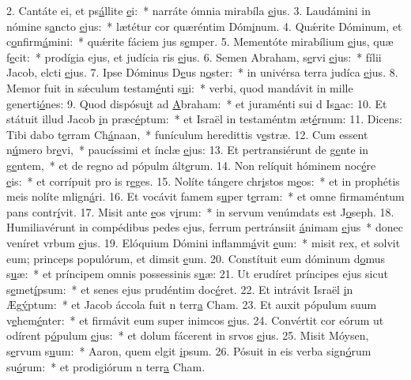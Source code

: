 2. Cantáte ei, et ps\uline{á}llite \uline{e}i:~* narráte ómnia mirabíla \uline{e}jus.
3. Laudámini in nómine s\uline{a}ncto \uline{e}jus:~* lætétur cor quæréntim Dóm\uline{i}num.
4. Quǽrite Dóminum, et c\uline{o}nfirm\uline{á}mini:~* quǽrite fáciem jus s\uline{e}mper.
5. Mementóte mirabílium \uline{e}jus, quæ f\uline{e}cit:~* prodígia ejus, et judícia ris \uline{e}jus.
6. Semen Abraham, s\uline{e}rvi \uline{e}jus:~* fílii Jacob, elcti \uline{e}jus.
7. Ipse Dóminus D\uline{e}us n\uline{o}ster:~* in univérsa terra judíca \uline{e}jus.
8. Memor fuit in sǽculum testam\uline{é}nti s\uline{u}i:~* verbi, quod mandávit in mille generti\uline{ó}nes:
9. Quod dispósu\uline{i}t ad \uline{A}braham:~* et juraménti sui d Is\uline{a}ac:
10. Et státuit illud Jacob \uline{i}n præc\uline{é}ptum:~* et Israël in testaméntm æt\uline{é}rnum:
11. Dicens: Tibi dabo t\uline{e}rram Ch\uline{á}naan,~* funículum heredittis v\uline{e}stræ.
12. Cum essent n\uline{ú}mero br\uline{e}vi,~* paucíssimi et ínclæ \uline{e}jus:
13. Et pertransiérunt de g\uline{e}nte in g\uline{e}ntem,~* et de regno ad pópulm ált\uline{e}rum.
14. Non relíquit hóminem noc\uline{é}re \uline{e}is:~* et corrípuit pro is r\uline{e}ges.
15. Nolíte tángere chr\uline{i}stos m\uline{e}os:~* et in prophétis meis nolíte mlign\uline{á}ri.
16. Et vocávit famem s\uline{u}per t\uline{e}rram:~* et omne firmaméntum pans contr\uline{í}vit.
17. Misit ante \uline{e}os v\uline{i}rum:~* in servum venúmdats est J\uline{o}seph.
18. Humiliavérunt in compédibus pedes ejus, ferrum pertránsiit \uline{á}nimam \uline{e}jus~* donec veníret vrbum \uline{e}jus.
19. Elóquium Dómini inflamm\uline{á}vit \uline{e}um:~* misit rex, et solvit eum; princeps populórum, et dimsit \uline{e}um.
20. Constítuit eum dóminum d\uline{o}mus s\uline{u}æ:~* et príncipem omnis possessinis s\uline{u}æ:
21. Ut erudíret príncipes ejus sicut s\uline{e}met\uline{í}psum:~* et senes ejus prudéntim doc\uline{é}ret.
22. Et intrávit Israël \uline{i}n Æg\uline{ý}ptum:~* et Jacob áccola fuit n terr\uline{a} Cham.
23. Et auxit pópulum suum v\uline{e}hem\uline{é}nter:~* et firmávit eum super inimcos \uline{e}jus.
24. Convértit cor eórum ut odírent p\uline{ó}pulum \uline{e}jus:~* et dolum fácerent in srvos \uline{e}jus.
25. Misit Móysen, s\uline{e}rvum s\uline{u}um:~* Aaron, quem elgit \uline{i}psum.
26. Pósuit in eis verba sign\uline{ó}rum su\uline{ó}rum:~* et prodigiórum n terr\uline{a} Cham.
